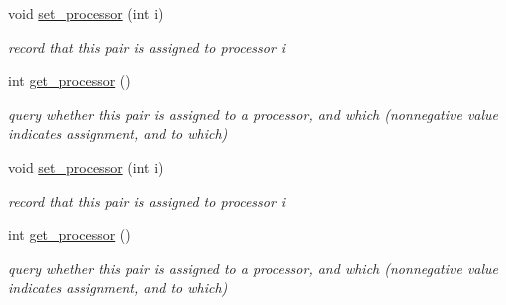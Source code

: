 \begin{Indent}
\begin{DoxyCompactItemize}
void \hyperlink{group___g_b_computation_a4c0085660583e247f354735ee900f2d3}{set\+\_\+processor} (int i)
\begin{DoxyCompactList}\small\item\em record that this pair is assigned to processor {\ttfamily i} \end{DoxyCompactList}\item 
\mbox{\label{group___g_b_computation_a1f07b8a991c138ad6c8de5deeb64ece6}} 
int \hyperlink{group___g_b_computation_a1f07b8a991c138ad6c8de5deeb64ece6}{get\+\_\+processor} ()
\begin{DoxyCompactList}\small\item\em query whether this pair is assigned to a processor, and which (nonnegative value indicates assignment, and to which) \end{DoxyCompactList}\item 
\mbox{\label{group___g_b_computation_a4c0085660583e247f354735ee900f2d3}} 
void \hyperlink{group___g_b_computation_a4c0085660583e247f354735ee900f2d3}{set\+\_\+processor} (int i)
\begin{DoxyCompactList}\small\item\em record that this pair is assigned to processor {\ttfamily i} \end{DoxyCompactList}\item 
\mbox{\label{group___g_b_computation_a1f07b8a991c138ad6c8de5deeb64ece6}} 
int \hyperlink{group___g_b_computation_a1f07b8a991c138ad6c8de5deeb64ece6}{get\+\_\+processor} ()
\begin{DoxyCompactList}\small\item\em query whether this pair is assigned to a processor, and which (nonnegative value indicates assignment, and to which) \end{DoxyCompactList}\end{DoxyCompactItemize}
\end{Indent}
